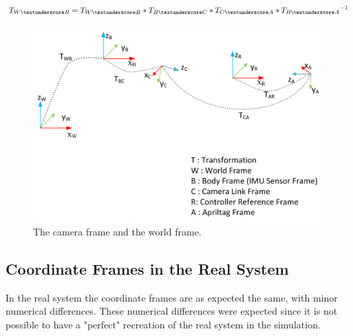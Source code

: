  
\begin{equation}
\label{TWR}
T_{W\textunderscore R} = T_{W\textunderscore B} * T_{B\textunderscore C} * T_{C\textunderscore A} * {T_{R\textunderscore A}}^{-1}
\end{equation}  
 
\begin{figure}
 \centering
 \includegraphics[width=0.99\textwidth]{images/coordinate_frame_representation_v3.pdf}
 \caption{The camera frame and the world frame.}
 \label{pics:mavcoordinateframe}
\end{figure}
  
  
\subsection{Coordinate Frames in the Real System}
\label{sec: CoordinatesinRealSystem}
  
In the real system the coordinate frames are as expected the same, with minor numerical differences. These numerical differences were expected since it is not possible to have a "perfect" recreation of the real system in the simulation. 

